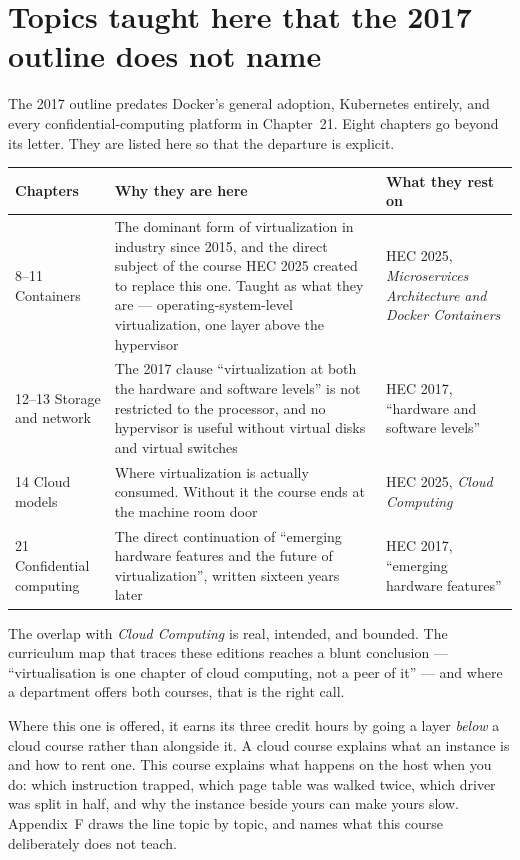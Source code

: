 \section*{Topics taught here that the 2017 outline does not name}

The 2017 outline predates Docker's general adoption, Kubernetes entirely, and
every confidential-computing platform in Chapter~21. Eight chapters go beyond
its letter. They are listed here so that the departure is explicit.

\begin{longtable}{@{}L{3.1cm}L{8.2cm}L{3.7cm}@{}}
\toprule
{}
\textbf{Chapters} & \textbf{Why they are here} & \textbf{What they rest on} \\
\midrule
{}--11 Containers & The dominant form of virtualization in industry since 2015,
and the direct subject of the course HEC 2025 created to replace this one.
Taught as what they are --- operating-system-level virtualization, one layer
above the hypervisor & HEC 2025, \emph{Microservices Architecture and Docker
Containers} \\
12--13 Storage and network & The 2017 clause ``virtualization at both the
hardware and software levels'' is not restricted to the processor, and no
hypervisor is useful without virtual disks and virtual switches & HEC 2017,
``hardware and software levels'' \\
14 Cloud models & Where virtualization is actually consumed. Without it the
course ends at the machine room door & HEC 2025, \emph{Cloud Computing} \\
21 Confidential computing & The direct continuation of ``emerging hardware
features and the future of virtualization'', written sixteen years later &
HEC 2017, ``emerging hardware features'' \\
\bottomrule
\end{longtable}

\begin{conceptbox}
The overlap with \emph{Cloud Computing} is real, intended, and bounded. The
curriculum map that traces these editions reaches a blunt conclusion ---
``virtualisation is one chapter of cloud computing, not a peer of it'' --- and
where a department offers both courses, that is the right call.

\smallskip
Where this one is offered, it earns its three credit hours by going a layer
\emph{below} a cloud course rather than alongside it. A cloud course explains
what an instance is and how to rent one. This course explains what happens on
the host when you do: which instruction trapped, which page table was walked
twice, which driver was split in half, and why the instance beside yours can
make yours slow. Appendix~F draws the line topic by topic, and names what this
course deliberately does not teach.
\end{conceptbox}

